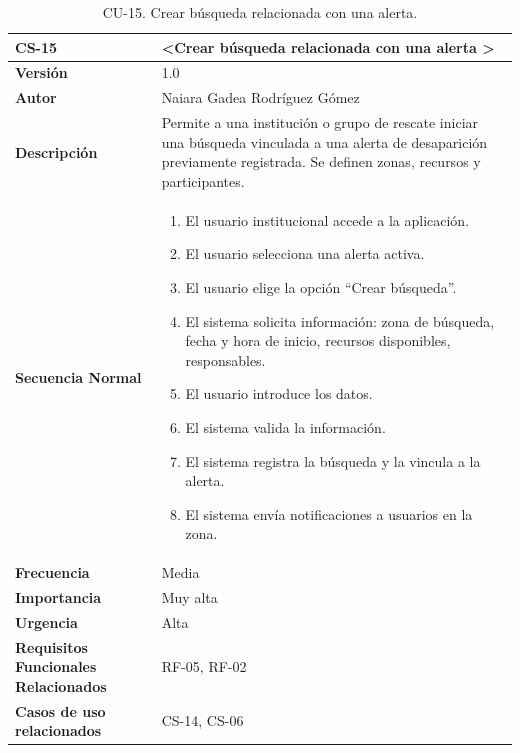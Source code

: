 \begin{table}[htbp] %
\centering
\begin{tabular}{ |m{3cm}|m{11cm}|  } 
\hline
\cellcolor[HTML]{B9E3F0}\centering\textbf{CS-15} & \cellcolor[HTML]{B9E3F0}\textbf{\textless Crear búsqueda relacionada con una alerta \textgreater}\\

\hline
\cellcolor[HTML]{EFEFEF}\textbf{Versión}             & 1.0  \\
\hline
\cellcolor[HTML]{EFEFEF}\textbf{Autor}                & Naiara Gadea Rodríguez Gómez\\
\hline
\cellcolor[HTML]{EFEFEF}\textbf{Descripción}                & {Permite a una institución o grupo de rescate iniciar una búsqueda vinculada a una alerta de desaparición previamente registrada. Se definen zonas, recursos y participantes.}\\
\hline
\cellcolor[HTML]{EFEFEF}\textbf{Secuencia \newline Normal}                &                 
        \begin{enumerate}
			\item El usuario institucional accede a la aplicación.
			\item El usuario selecciona una alerta activa.
			\item El usuario elige la opción “Crear búsqueda”.
			\item El sistema solicita información: zona de búsqueda, fecha y hora de inicio, recursos disponibles, responsables.
			\item El usuario introduce los datos.
			\item El sistema valida la información.
			\item El sistema registra la búsqueda y la vincula a la alerta.
			\item El sistema envía notificaciones a usuarios en la zona.
		\end{enumerate}\\
\hline
\cellcolor[HTML]{EFEFEF}\textbf{Frecuencia}                & Media\\
\hline
\cellcolor[HTML]{EFEFEF}\textbf{Importancia}                & Muy alta\\
\hline
\cellcolor[HTML]{EFEFEF}\textbf{Urgencia}                & Alta\\
\hline
\cellcolor[HTML]{EFEFEF}\textbf{Requisitos Funcionales Relacionados}                & {RF-05, RF-02}\\
\hline
\cellcolor[HTML]{EFEFEF}\textbf{Casos de uso relacionados}                & {CS-14, CS-06}\\
\hline
\end{tabular}
\caption{CU-15. Crear búsqueda relacionada con una alerta.}
\end{table}

